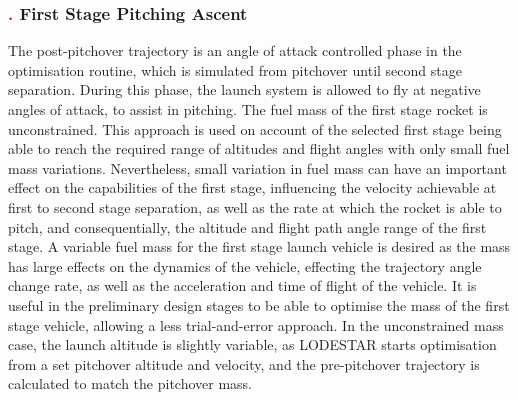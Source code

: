 \subsubsection{\textcolor{red}{.} First Stage Pitching Ascent}


The post-pitchover trajectory is an angle of attack controlled phase in the optimisation routine, which is simulated from pitchover until second stage separation. During this phase, the launch system is allowed to fly at negative angles of attack, to assist in pitching. 
The fuel mass of the first stage rocket is unconstrained.
This approach is used on account of the selected first stage being able to reach the required range of altitudes and flight angles with only small fuel mass variations. 
Nevertheless, small variation in fuel mass can have an important effect on the capabilities of the first stage, influencing the velocity achievable at first to second stage separation, as well as the rate at which the rocket is able to pitch, and consequentially, the altitude and flight path angle range of the first stage.
A variable fuel mass for the first stage launch vehicle is desired as the mass has large effects on the dynamics of the vehicle, effecting the trajectory angle change rate, as well as the acceleration and time of flight of the vehicle.
It is useful in the preliminary design stages to be able to optimise the mass of the first stage vehicle, allowing a less trial-and-error approach.
In the unconstrained mass case, the launch altitude is slightly variable, as LODESTAR starts optimisation from a set pitchover altitude and velocity, and the pre-pitchover trajectory is calculated to match the pitchover mass. 



